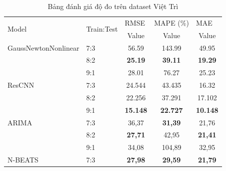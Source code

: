 \documentclass[conference]{IEEEtran}
\begin{document}
\begin{table}[ht]
    \centering
    \caption{Bảng đánh giá độ đo trên dataset Việt Trì}
    \begin{tabular}{|l|l|c|c|c|}
        \hline
        \multirow{2}{*}{Model} & \multirow{2}{*}{Train:Test} & \multicolumn{1}{l|}{RMSE} & \multicolumn{1}{l|}{MAPE (\%)} & \multicolumn{1}{l|}{MAE} \\ \cline{3-5}
                               &                             & Value                     & Value                          & Value                    \\ \hline
        GaussNewtonNonlinear   & 7:3                         & 56.59                     & 143.99                         & 49.95                    \\ \cline{2-5}
                               & 8:2                         & \textbf{25.19}            & \textbf{39.11}                 & \textbf{19.29}           \\ \cline{2-5}
                               & 9:1                         & 28.01                     & 76.27                          & 25.23                    \\ \hline
        ResCNN                 & 7:3                         & 24.544                    & 43.435                         & 16.32                    \\ \cline{2-5}
                               & 8:2                         & 22.256                    & 37.291                         & 17.102                   \\ \cline{2-5}
                               & 9:1                         & \textbf{15.148}           & \textbf{22.727}                & \textbf{10.148}          \\ \hline
        ARIMA                  & 7:3                         & 36,37                     & \textbf{31,39}                 & 21,76                    \\ \cline{2-5}
                               & 8:2                         & \textbf{27,71}            & 42,95                          & \textbf{21,41}           \\ \cline{2-5}
                               & 9:1                         & 34,08                     & 104,89                         & 32,95                    \\ \hline
        N-BEATS                & 7:3                         & \textbf{27,98}            & \textbf{29,59}                 & \textbf{21,79}           \\ \cline{2-5}

\end{tabular}
\end{table}
\end{document}

